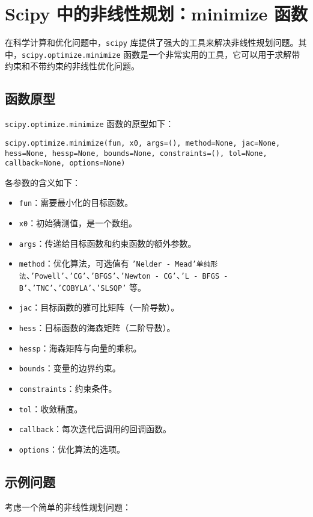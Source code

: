 \documentclass{article}
\begin{document}
\section{Scipy 中的非线性规划：minimize 函数}

在科学计算和优化问题中，\texttt{scipy} 库提供了强大的工具来解决非线性规划问题。其中，\texttt{scipy.optimize.minimize} 函数是一个非常实用的工具，它可以用于求解带约束和不带约束的非线性优化问题。

\subsection{函数原型}
\texttt{scipy.optimize.minimize} 函数的原型如下：
\begin{lstlisting}[style=pythonstyle]
scipy.optimize.minimize(fun, x0, args=(), method=None, jac=None, hess=None, hessp=None, bounds=None, constraints=(), tol=None, callback=None, options=None)
\end{lstlisting}
各参数的含义如下：
\begin{itemize}
    \item \texttt{fun}：需要最小化的目标函数。
    \item \texttt{x0}：初始猜测值，是一个数组。
    \item \texttt{args}：传递给目标函数和约束函数的额外参数。
    \item \texttt{method}：优化算法，可选值有 \texttt{'Nelder - Mead'单纯形法}、\texttt{'Powell'}、\texttt{'CG'}、\texttt{'BFGS'}、\texttt{'Newton - CG'}、\texttt{'L - BFGS - B'}、\texttt{'TNC'}、\texttt{'COBYLA'}、\texttt{'SLSQP'} 等。
    \item \texttt{jac}：目标函数的雅可比矩阵（一阶导数）。
    \item \texttt{hess}：目标函数的海森矩阵（二阶导数）。
    \item \texttt{hessp}：海森矩阵与向量的乘积。
    \item \texttt{bounds}：变量的边界约束。
    \item \texttt{constraints}：约束条件。
    \item \texttt{tol}：收敛精度。
    \item \texttt{callback}：每次迭代后调用的回调函数。
    \item \texttt{options}：优化算法的选项。
\end{itemize}

\subsection{示例问题}
考虑一个简单的非线性规划问题：
\end{document}
